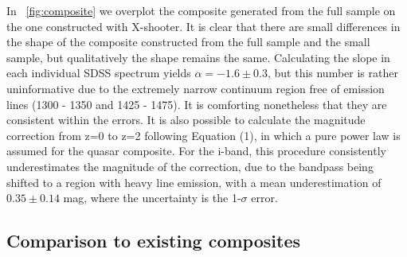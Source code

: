 \documentclass{aa}    %
\newcommand{\figref}[1]{\ref{fig:#1}}
\newcommand{\Fig}[1]{\figurename~\figref{#1}}
\newcommand{\fig}[1]{\Fig{#1}}
\newcommand{\figlabel}[1]{\label{fig:#1}}
\newcommand{\sectlabel}[1]{\label{sect:#1}}
\newcommand{\todo}[3]{{\color{#2}\emph{#1}: #3}}
\newcommand{\jstodo}[1]{\todo{ \\TODO }{green}{#1}}
\begin{document}

In \fig{composite} we overplot the composite generated from the full sample on the one constructed with X-shooter. It is clear that there are small differences in the shape of the composite constructed from the full sample and the small sample, but qualitatively the shape remains the same. Calculating the slope in each individual SDSS spectrum yields $\alpha = -1.6\pm 0.3$, but this number is rather uninformative due to the extremely narrow continuum region free of emission lines (1300 - 1350 and 1425 - 1475). It is comforting nonetheless that they are consistent within the errors. 
It is also possible to calculate the magnitude correction from z=0 to z=2 following \cite{Richards2006a} Equation (1), in which a pure power law is assumed for the quasar composite. For the i-band, this procedure consistently underestimates the magnitude of the correction, due to the bandpass being shifted to a region with heavy line emission, with a mean underestimation of $0.35 \pm 0.14$ mag, where the uncertainty is the 1-$\sigma$ error.





\subsection{Comparison to existing composites} \sectlabel{comparison}
\end{document}
